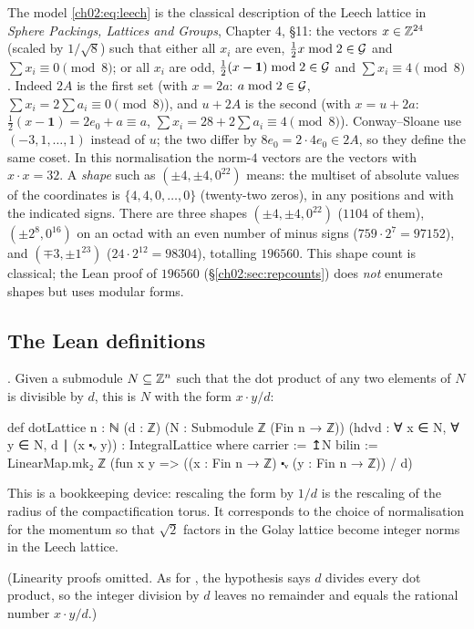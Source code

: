 \begin{remark}\label{ch02:rem:cs}
The model \eqref{ch02:eq:leech} is the classical description of the Leech lattice in
\emph{Sphere Packings, Lattices and Groups}, Chapter 4, \S11: the vectors $x\in{\mathbb{Z}}^{24}$
(scaled by $1/\sqrt8$) such that either all $x_i$ are even, $\tfrac12x\bmod2\in\mathcal{G}$ and
$\sum x_i\equiv0\pmod 8$; or all $x_i$ are odd, $\tfrac12(x-\mathbf1)\bmod2\in\mathcal{G}$ and $\sum
x_i\equiv4\pmod8$.  Indeed $2A$ is the first set (with $x=2a$: $a\bmod2\in\mathcal{G}$, $\sum
x_i=2\sum a_i\equiv0\pmod8$), and $u+2A$ is the second (with $x=u+2a$: $\tfrac12(x-\mathbf
1)=2e_0+a\equiv a$, $\sum x_i=28+2\sum a_i\equiv4\pmod 8$).  Conway--Sloane use
$(-3,1,\dots,1)$ instead of $u$; the two differ by $8e_0=2\cdot4e_0\in2A$, so they define the
same coset.  In this normalisation the norm-$4$ vectors are the vectors with $x\cdot x=32$.  A
\emph{shape} such as $(\pm4,\pm4,0^{22})$ means: the multiset of absolute values of the
coordinates is $\{4,4,0,\dots,0\}$ (twenty-two zeros), in any positions and with the indicated
signs.  There are three shapes $(\pm4,\pm4,0^{22})$ ($1104$ of them), $(\pm2^8,0^{16})$ on an octad with an even
number of minus signs ($759\cdot2^7=97152$), and $(\mp3,\pm1^{23})$ ($24\cdot2^{12}=98304$),
totalling $196560$.  This shape count is classical; the Lean proof of $196560$
(\S\ref{ch02:sec:repcounts}) does \emph{not} enumerate shapes but uses modular forms.
\end{remark}

\subsection{The Lean definitions}

\begin{definition}
.  Given a submodule $N\subseteq{\mathbb{Z}}^n$ such that
the dot product of any two elements of $N$ is divisible by $d$, this is $N$ with the form
$x\cdot y/d$:
\end{definition}
\begin{leancode}
def dotLattice {n : ℕ} (d : ℤ) (N : Submodule ℤ (Fin n → ℤ))
    (hdvd : ∀ x ∈ N, ∀ y ∈ N, d ∣ (x ⬝ᵥ y)) : IntegralLattice where
  carrier := ↥N
  bilin := LinearMap.mk₂ ℤ
    (fun x y => ((x : Fin n → ℤ) ⬝ᵥ (y : Fin n → ℤ)) / d)
\end{leancode}
\begin{physics}
This is a bookkeeping device: rescaling the form by $1/d$ is the rescaling of the radius of the compactification torus. It corresponds to the choice of normalisation for the momentum so that $\sqrt2$ factors in the Golay lattice become integer norms in the Leech lattice.
\end{physics}
(Linearity proofs omitted.  As for , the hypothesis  says $d$
divides every dot product, so the integer division by $d$ leaves no remainder and equals the
rational number $x\cdot y/d$.)

